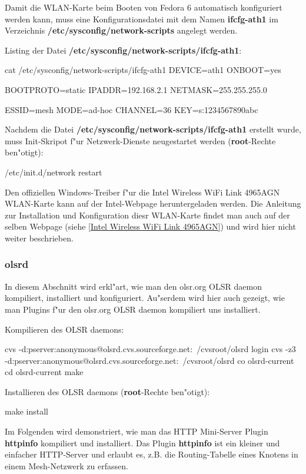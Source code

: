 Damit die WLAN-Karte beim Booten von Fedora 6
automatisch konfiguriert werden kann, muss eine Konfigurationsdatei
mit dem Namen \textbf{ifcfg-ath1} im Verzeichnis
\textbf{/etc/sysconfig/network-scripts} angelegt werden.

Listing der Datei \textbf{/etc/sysconfig/network-scripts/ifcfg-ath1}:
\begin{shelllst}
cat /etc/sysconfig/network-scripts/ifcfg-ath1
DEVICE=ath1
ONBOOT=yes
			
BOOTPROTO=static
IPADDR=192.168.2.1
NETMASK=255.255.255.0
			
ESSID=mesh
MODE=ad-hoc
CHANNEL=36
KEY=s:1234567890abc
\end{shelllst}

Nachdem die Datei \textbf{/etc/sysconfig/network-scripts/ifcfg-ath1}
erstellt wurde, muss Init-Skripot f"ur Netzwerk-Dienste neugestartet
werden (\textbf{root}-Rechte ben"otigt):
\begin{shelllst}
/etc/init.d/network restart
\end{shelllst}

Den offiziellen Windows-Treiber f"ur die Intel Wireless WiFi Link 4965AGN
WLAN-Karte kann auf der Intel-Webpage heruntergeladen werden. Die Anleitung
zur Installation und Konfiguration diesr WLAN-Karte findet man auch
auf der selben Webpage (siehe \ref{Intel Wireless WiFi Link 4965AGN}) und
wird hier nicht weiter beschrieben.

\subsubsection{olsrd}

In diesem Abschnitt wird erkl"art, wie man den olsr.org OLSR daemon kompiliert,
installiert und konfiguriert. Au"serdem wird hier auch gezeigt, wie man
Plugins f"ur den olsr.org OLSR daemon kompiliert uns installiert.

Kompilieren des OLSR daemons:
\begin{shelllst}
cvs -d:pserver:anonymous@olsrd.cvs.sourceforge.net:\
	/cvsroot/olsrd login
cvs -z3 -d:pserver:anonymous@olsrd.cvs.sourceforge.net:\
	/cvsroot/olsrd co olsrd-current
cd olsrd-current
make
\end{shelllst}

Installieren des OLSR daemons (\textbf{root}-Rechte ben"otigt):
\begin{shelllst}
make install
\end{shelllst}

Im Folgenden wird demonstriert, wie man
das HTTP Mini-Server Plugin \textbf{httpinfo} kompiliert und installiert.
Das Plugin \textbf{httpinfo} ist ein kleiner und einfacher HTTP-Server und
erlaubt es, z.B. die Routing-Tabelle eines Knotens in einem Mesh-Netzwerk
zu erfassen.

